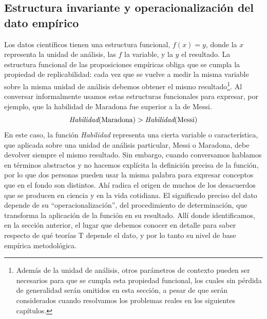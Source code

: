 \documentclass[a4paper,10pt]{book}
\theoremstyle{definition}
\begin{document}
\subsection{Estructura invariante y operacionalizaci\'on del dato emp\'irico}

Los datos cient\'ificos tienen una estructura funcional, $f(x)=y$, donde la $x$ representa la unidad de análisis, las $f$ la variable, y la $y$ el resultado.
%
La estructura funcional de las proposiciones emp\'iricas obliga que se cumpla la propiedad de replicabilidad: cada vez que se vuelve a medir la misma variable sobre la misma unidad de análisis debemos obtener el mismo resultado\footnote{Además de la unidad de análisis, otros parámetros de contexto pueden ser necesarios para que se cumpla esta propiedad funcional, los cuales sin pérdida de generalidad serán omitidos en esta secci\'on, a pesar de que serán considerados cuando resolvamos los problemas reales en los siguientes cap\'itulos.}.
%
Al conversar informalmente usamos estas estructuras funcionales para expresar, por ejemplo, que la habilidad de Maradona fue superior a la de Messi.
%
\begin{equation}\label{eq:opiniones}
 \emph{Habilidad}(\text{Maradona}) > \emph{Habilidad}(\text{Messi})
\end{equation}
%
En este caso, la funci\'on \emph{Habilidad} representa una cierta variable o caracter\'istica, que aplicada sobre una unidad de an\'alisis particular, Messi o Maradona, debe devolver siempre el mismo resultado.
%
Sin embargo, cuando conversamos hablamos en términos abstractos y no hacemos expl\'icita la definici\'on precisa de la funci\'on, por lo que dos personas pueden usar la misma palabra para expresar conceptos que en el fondo son distintos.
%
Ah\'i radica el origen de muchos de los desacuerdos que se producen en ciencia y en la vida cotidiana.
%
El significado preciso del dato depende de su ``operacionalizaci\'on'', del procedimiento de determinaci\'on, que transforma la aplicaci\'on de la funci\'on en su resultado.
%
All\'i donde identificamos, en la secci\'on anterior, el lugar que debemos conocer en detalle para saber respecto de qué teor\'ias T depende el dato, y por lo tanto su nivel de base emp\'irica metodol\'ogica.

\end{document}
